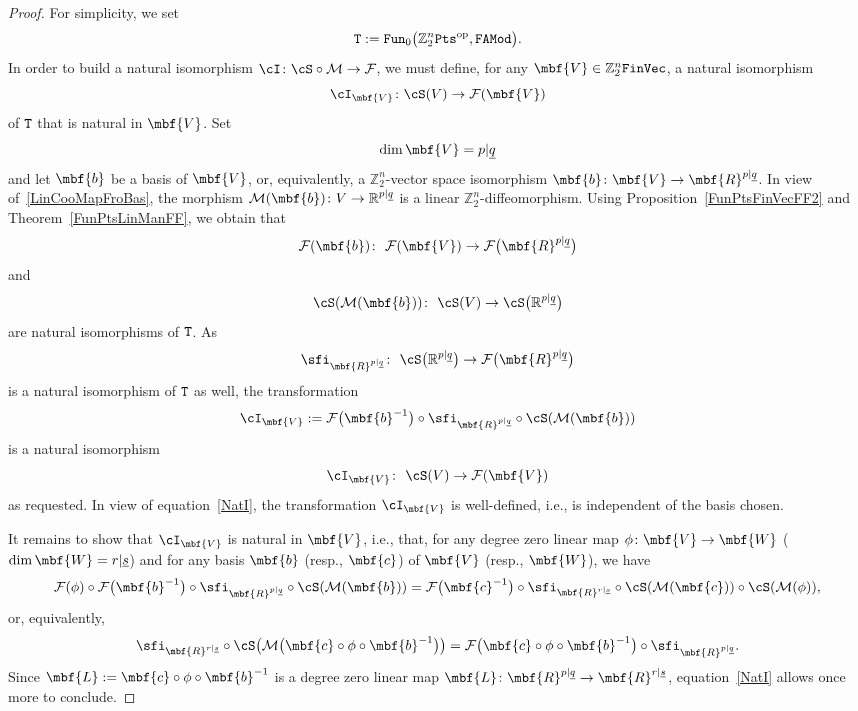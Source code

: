 \documentclass[pdftex]{sigma}%
\newcommand{\op}[1]{\operatorname{#1}}
\newcommand{\R}{{\mathbb R}}
\newcommand{\Z}{{\mathbb Z}}
\def\ul{\underline}
\def\cM{\cal M}
\def\cF{\mathcal{F}}
\def\cM{\mathcal{M}}
\def\ul{\underline}
\newcommand{\0}{\otimes}
\newcommand{\z}{\Z_2^n}
\numberwithin{equation}{section}
\begin{document}
\begin{proof}
For simplicity, we set
\[
{\tt T}:={\tt Fun}_0\big(\z{\tt Pts}^{\op{op}},{\tt FAMod}\big).
\]
In order to build a natural isomorphism $\cI\colon \cS\circ\cM\to\cF$, we must define, for any $\mbf{V}\in\z{\tt FinVec}$, a natural isomorphism
\[
\cI_{\mbf{V}}\colon \cS(V)\to \cF(\mbf{V})
\]
of ${\tt T}$ that is natural in $\mbf{V}$.
Set
\[
\dim\mbf{V}=p|\ul q
\]
and let $\mbf{b}$ be a basis of $\mbf{V}$, or, equivalently, a $\z$-vector space isomorphism $\mbf{b}\colon \mbf{V}\to\mbf{R}^{p|\ul q}$. In view of~\eqref{LinCooMapFroBas}, the morphism $\cM(\mbf{b})\colon V\to \R^{p|\ul q}$ is a linear $\z$-diffeomorphism. Using Proposition~\ref{FunPtsFinVecFF2} and Theorem~\ref{FunPtsLinManFF}, we obtain that
\[
\cF(\mbf{b})\colon\ \cF(\mbf{V})\to\cF\big(\mbf{R}^{p|\ul q}\big)
\]
and
\[
\cS(\cM(\mbf{b}))\colon\ \cS(V)\to\cS\big(\R^{p|\ul q}\big)
\]
are natural isomorphisms of ${\tt T}$. As
\[
\sfi_{\mbf{R}^{p|\ul q}}\colon\ \cS\big(\R^{p|\ul q}\big)\to\cF\big(\mbf{R}^{p|\ul q}\big)
\]
is a natural isomorphism of ${\tt T}$ as well, the transformation
\[
\cI_{\mbf{V}}:=\cF\big(\mbf{b}^{-1}\big)\circ\sfi_{\mbf{R}^{p|\ul q}}\circ\cS(\cM(\mbf{b}))
\]
is a natural isomorphism
\[
\cI_{\mbf{V}}\colon\ \cS(V)\to\cF(\mbf{V})
\]
as requested. In view of equation~\eqref{NatI}, the transformation $\cI_{\mbf{V}}$ is well-defined, i.e., is independent of the basis chosen.

It remains to show that $\cI_\mbf{V}$ is natural in $\mbf{V}$, i.e., that, for any degree zero linear map $\phi\colon \mbf{V}\to\mbf{W}$ ($\dim\mbf{W}=r|\ul s$) and for any basis $\mbf{b}$ (resp., $\mbf{c}$) of $\mbf{V}$ (resp., $\mbf{W}$), we have
\[
\cF(\phi)\circ\cF\big(\mbf{b}^{-1}\big)\circ\sfi_{\mbf{R}^{p|\ul q}}\circ\cS(\cM(\mbf{b}))=\cF\big(\mbf{c}^{-1}\big)\circ\sfi_{\mbf{R}^{r|\ul s}}\circ\cS(\cM(\mbf{c}))\circ\cS(\cM(\phi)),
\]
or, equivalently,
\[
\sfi_{\mbf{R}^{r|\ul s}}\circ\cS\big(\cM\big(\mbf{c}\circ\phi\circ\mbf{b}^{-1}\big)\big) =\cF\big(\mbf{c}\circ\phi\circ\mbf{b}^{-1}\big)\circ \sfi_{\mbf{R}^{p|\ul q}}.
\]
Since $\mbf{L}:=\mbf{c}\circ\phi\circ\mbf{b}^{-1}$ is a degree zero linear map $\mbf{L}\colon \mbf{R}^{p|\ul q}\to\mbf{R}^{r|\ul s}$, equation~\eqref{NatI} allows once more to conclude.
\end{proof}

\newcommand{\ccD}{\mathcal{D}}
\end{document}
